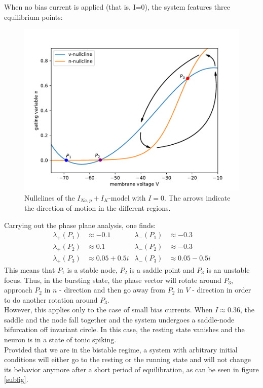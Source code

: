 \documentclass[12pt,a4paper]{article}
\begin{document}
When no bias current is applied (that is, I=0), the system features three equilibrium points:
\begin{figure}[H]
	\centering
	\includegraphics[scale=0.5]{inapikrealncwnp.pdf}\caption{Nullclines of the $I_{Na,p}+I_K$-model with $I=0$. The arrows indicate the direction of motion in the different regions.}
	\label{realnc}
\end{figure}
Carrying out the phase plane analysis, one finds:
\begin{align*}
\lambda_+(P_1)&\approx-0.1 & \lambda_-(P_1)&\approx-0.3\\
\lambda_+(P_2)&\approx 0.1& \lambda_-(P_2)&\approx -0.3\\
\lambda_+(P_3)&\approx 0.05 + 0.5i& \lambda_-(P_3)&\approx 0.05 - 0.5i
\end{align*}
This means that $P_1$ is a stable node, $P_2$ is a saddle point and $P_3$ is an unstable focus. Thus, in the bursting state, the phase vector will rotate around $P_3$, approach $P_2$ in $n$ - direction and then go away from $P_2$ in $V$ - direction in order to do another rotation around $P_3$.\\
However, this applies only to the case of small bias currents. When $I\approx 0.36$, the saddle and the node fall together and the system undergoes a saddle-node bifurcation off invariant circle. In this case, the resting state vanishes and the neuron is in a state of tonic spiking.
\\
Provided that we are in the bistable regime, a system with arbitrary initial conditions will either go to the resting or the running state and will not change its behavior anymore after a short period of equilibration, as can be seen in figure \ref{subfig}. 
\end{document}
